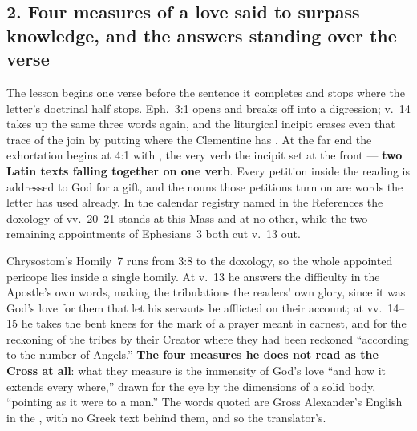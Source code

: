 \subsection*{2. Four measures of a love said to surpass knowledge, and the answers standing over the verse}

The lesson begins one verse before the sentence it completes and stops where the
letter's doctrinal half stops. Eph.~3:1 opens  and breaks
off into a digression; v.~14 takes up the same three words again, and the
liturgical incipit erases even that trace of the join by putting
 where the Clementine has .
At the far end the exhortation begins at 4:1 with , the
very verb the incipit set at the front --- \textbf{two Latin texts falling
together on one verb}. Every petition inside the reading is addressed to God for a gift, and the nouns
those petitions turn on are words the letter has used already. In the calendar registry named in the
References the doxology of vv.~20--21 stands at this Mass and at no other, while
the two remaining appointments of Ephesians~3 both cut v.~13 out.

Chrysostom's Homily~7 runs from 3:8 to the doxology, so the whole appointed
pericope lies inside a single homily. At v.~13 he answers the difficulty in the
Apostle's own words, making the tribulations the readers' own glory, since it was
God's love for them that let his servants be afflicted on their account; at vv.~14--15 he takes the
bent knees for the mark of a prayer meant in earnest, and  for the reckoning of the tribes by their Creator where they had been
reckoned ``according to the number of Angels.'' \textbf{The four measures he does
not read as the Cross at all}: what they measure is the immensity of God's love
``and how it extends every where,'' drawn for the eye by the dimensions of a
solid body, ``pointing as it were to a man.'' The words quoted are Gross Alexander's English in the ,
with no Greek text behind them, and so the translator's.

